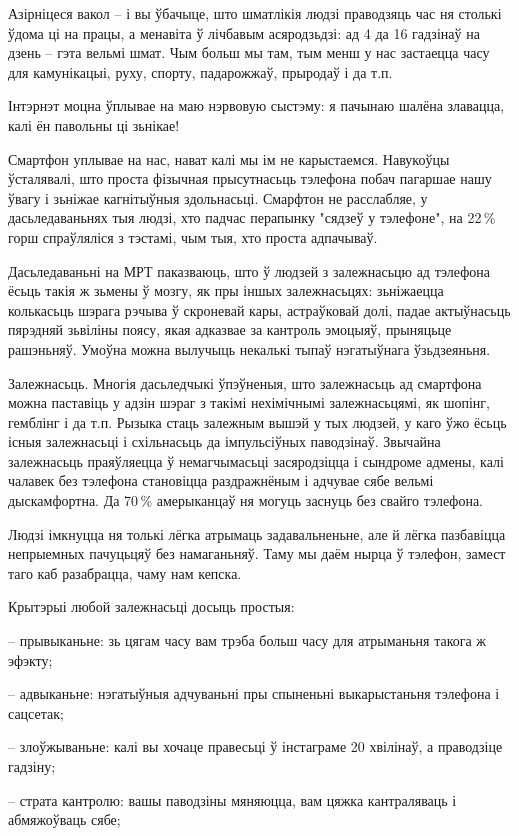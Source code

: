 Азірніцеся вакол – і вы ўбачыце, што шматлікія людзі праводзяць час ня столькі ўдома ці на працы, а менавіта ў лічбавым асяродзьдзі: ад 4 да 16 гадзінаў на дзень – гэта вельмі шмат. Чым больш мы там, тым менш у нас застаецца часу для камунікацыі, руху, спорту, падарожжаў, прыродаў і да т.п.

Інтэрнэт моцна ўплывае на маю нэрвовую сыстэму: я пачынаю шалёна злавацца, калі ён павольны ці зьнікае!

Смартфон уплывае на нас, нават калі мы ім не карыстаемся. Навукоўцы ўсталявалі, што проста фізычная прысутнасьць тэлефона побач пагаршае нашу ўвагу і зьніжае кагнітыўныя здольнасьці. Смарфтон не расслабляе, у дасьледаваньнях тыя людзі, хто падчас перапынку "сядзеў у тэлефоне", на 22\,\% горш спраўляліся з тэстамі, чым тыя, хто проста адпачываў.

Дасьледаваньні на МРТ паказваюць, што ў людзей з залежнасьцю ад тэлефона ёсьць такія ж зьмены ў мозгу, як пры іншых залежнасьцях: зьніжаецца колькасьць шэрага рэчыва ў скроневай кары, астраўковай долі, падае актыўнасьць пярэдняй зьвіліны поясу, якая адказвае за кантроль эмоцыяў, прыняцьце рашэньняў. Умоўна можна вылучыць некалькі тыпаў нэгатыўнага ўзьдзеяньня.

Залежнасьць. Многія дасьледчыкі ўпэўненыя, што залежнасьць ад смартфона можна паставіць у адзін шэраг з такімі нехімічнымі залежнасьцямі, як шопінг, гемблінг і да т.п. Рызыка стаць залежным вышэй у тых людзей, у каго ўжо ёсьць існыя залежнасьці і схільнасьць да імпульсіўных паводзінаў. Звычайна залежнасьць праяўляецца ў немагчымасьці засяродзіцца і сындроме адмены, калі чалавек без тэлефона становіцца раздражнёным і адчувае сябе вельмі дыскамфортна. Да 70\,\% амерыканцаў ня могуць заснуць без свайго тэлефона. 

Людзі імкнуцца ня толькі лёгка атрымаць задавальненьне, але й лёгка пазбавіцца непрыемных пачуцьцяў без намаганьняў. Таму мы даём нырца ў тэлефон, замест таго каб разабрацца, чаму нам кепска.

Крытэрыі любой залежнасьці досыць простыя: 

– прывыканьне: зь цягам часу вам трэба больш часу для атрыманьня такога ж эфэкту;

– адвыканьне: нэгатыўныя адчуваньні пры спыненьні выкарыстаньня тэлефона і сацсетак;

– злоўжываньне: калі вы хочаце правесьці ў інстаграме 20 хвілінаў, а праводзіце гадзіну;

– страта кантролю: вашы паводзіны мяняюцца, вам цяжка кантраляваць і абмяжоўваць сябе;

